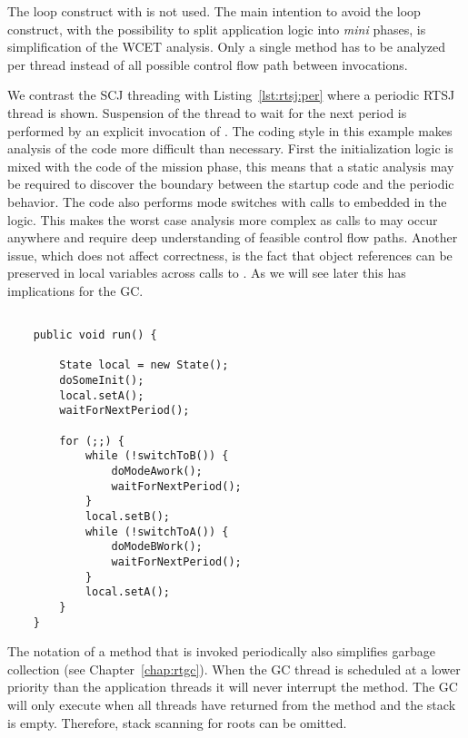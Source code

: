 The loop construct with  is not used. The main
intention to avoid the loop construct, with the possibility to split
application logic into \emph{mini} phases, is simplification of the
WCET analysis. Only a single method has to be analyzed per thread
instead of all possible control flow path between 
invocations.

We contrast the SCJ threading with Listing~\ref{lst:rtsj:per} where a
periodic RTSJ thread is shown. Suspension of the thread to wait for
the next period is performed by an explicit invocation of
. The coding style in this example makes analysis of the
code more difficult than necessary. First the initialization logic is
mixed with the code of the mission phase, this means that a static
analysis may be required to discover the boundary between the startup
code and the periodic behavior. The code also performs mode switches
with calls to  embedded in the logic. This makes the
worst case analysis more complex as calls to  may occur
anywhere and require deep understanding of feasible control flow
paths.  Another issue, which does not affect correctness, is the fact
that object references can be preserved in local variables across
calls to . As we will see later this has implications
for the GC.

\begin{lstlisting}[float=t,caption={Possible logic for a periodic thread in the RTSJ},
label=lst:rtsj:per]

    public void run() {

        State local = new State();
        doSomeInit();
        local.setA();
        waitForNextPeriod();

        for (;;) {
            while (!switchToB()) {
                doModeAwork();
                waitForNextPeriod();
            }
            local.setB();
            while (!switchToA()) {
                doModeBWork();
                waitForNextPeriod();
            }
            local.setA();
        }
    }
\end{lstlisting}

The notation of a  method that is invoked periodically
also simplifies garbage collection (see Chapter~\ref{chap:rtgc}).
When the GC thread is scheduled at a lower priority than the
application threads it will never interrupt the  method.
The GC will only execute when all threads have returned from the
 method and the stack is empty. Therefore, stack scanning
for roots can be omitted.
